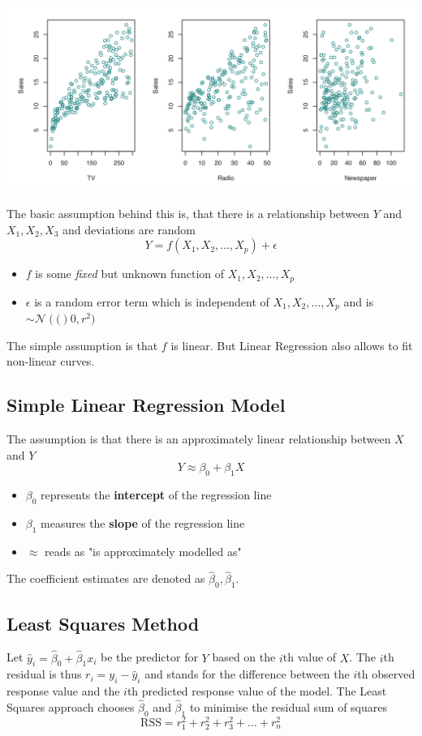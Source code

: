 \documentclass[11pt]{article}
\theoremstyle{definition}
\newcommand*\N[1]{\mathcal{N}\left(#1\right)}
\begin{document}
\begin{center}
	\includegraphics[width=0.8\linewidth]{img/sales_advertising}
\end{center}

The basic assumption behind this is, that there is a relationship between $Y$ and $X_1, X_2, X_3$ and deviations are random
\begin{equation*}
	Y = f(X_1, X_2,\dots, X_p) + \epsilon
\end{equation*}
\begin{itemize}
	\item $f$ is some \emph{fixed} but unknown function of $X_1, X_2,\dots, X_p$
	\item $\epsilon$ is a random error term which is independent of $X_1, X_2,\dots, X_p$ and is $\sim\N(0,r^2)$
\end{itemize}
The simple assumption is that $f$ is linear. But Linear Regression also allows to fit non-linear curves.

\subsection{Simple Linear Regression Model}
The assumption is that there is an approximately linear relationship between $X$ and $Y$
\begin{equation*}
	Y \approx \beta_0 + \beta_1 X
\end{equation*}
\begin{itemize}[noitemsep]
	\item $\beta_0$ represents the \textbf{intercept} of the regression line
	\item $\beta_1$ measures the \textbf{slope} of the regression line
	\item $\approx$ reads as "is approximately modelled as"
\end{itemize}
The coefficient estimates are denoted as $\hat{\beta}_0, \hat{\beta}_1$.

\subsection{Least Squares Method}
Let $\hat{y}_i = \hat{\beta}_0 + \hat{\beta}_1 x_i$ be the predictor for $Y$ based on the $i$th value of $X$. The $i$th residual is thus $r_i = y_i - \hat{y}_i$ and stands for the difference between the $i$th observed response value and the $i$th predicted response value of the model. The Least Squares approach chooses $\hat{\beta}_0$ and $\hat{\beta}_1$ to minimise the residual sum of squares
\begin{equation*}
	\text{RSS} = r_1^2 + r_2^2 + r_3^2 + \dots + r_n^2
\end{equation*}
\end{document}
